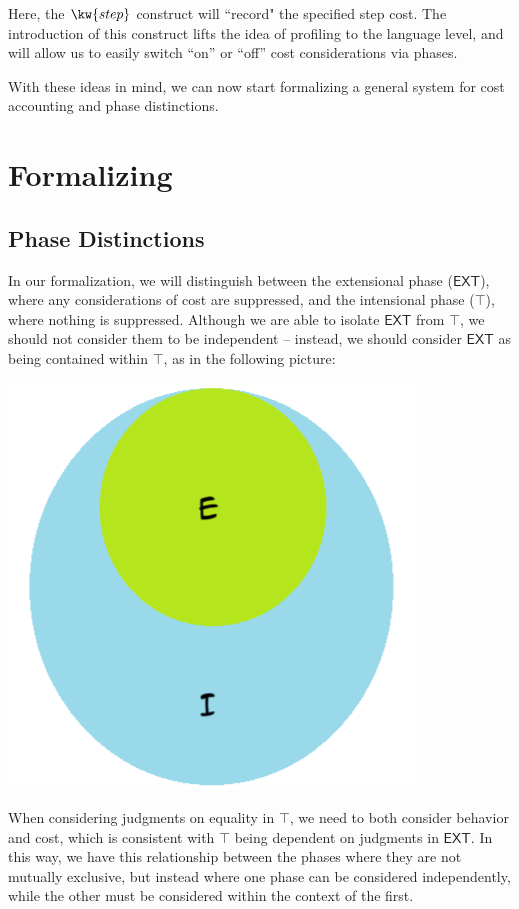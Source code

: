 \documentclass[letterpaper]{article}
\newcommand{\EXT}{\textsf{EXT}}
\begin{document}
Here, the $\kw{step}$ construct will ``record" the specified step cost. The introduction of this construct lifts the idea of profiling to the language level,
and will allow us to easily switch ``on'' or ``off'' cost considerations via phases.

With these ideas in mind, we can now start formalizing a general system for cost accounting and phase distinctions.

\section{Formalizing}

\subsection{Phase Distinctions}\label{phases}

In our formalization, we will distinguish between the extensional phase ($\EXT$), where any considerations of cost are suppressed, and the intensional phase ($\top$), where nothing is suppressed.
Although we are able to isolate $\EXT$ from $\top$, we should not consider them to be independent -- instead, we should consider $\EXT$ as being contained within $\top$, as in the following picture:

\begin{center}
    \includegraphics[scale=0.5]{phases.png}
\end{center}

When considering judgments on equality in $\top$, we need to both consider behavior and cost, which is consistent with $\top$ being dependent on judgments in $\EXT$.
In this way, we have this relationship between the phases where they are not mutually exclusive, but instead where one phase can be considered independently, while the other must be considered within the context of the first.
\end{document}
